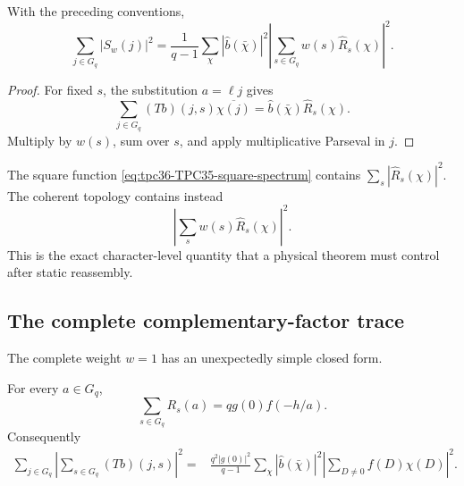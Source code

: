 \begin{theorem}
\label{thm:tpc36-weighted-coherent-spectrum}
With the preceding conventions,
\begin{equation}
 \boxed{
 \sum_{j\in G_q}|S_w(j)|^2
 =\frac1{q-1}\sum_\chi
 |\widehat b(\bar\chi)|^2
 \left|\sum_{s\in G_q}w(s)\widehat R_s(\chi)\right|^2.}
 \label{eq:tpc36-weighted-coherent-spectrum}
\end{equation}
\end{theorem}

\begin{proof}
For fixed \(s\), the substitution \(a=\ell j\) gives
\begin{equation}
 \sum_{j\in G_q}(Tb)(j,s)\overline{\chi(j)}
 =\widehat b(\bar\chi)\widehat R_s(\chi).
 \label{eq:tpc36-fixed-s-transform}
\end{equation}
Multiply by \(w(s)\), sum over \(s\), and apply multiplicative Parseval
in \(j\).
\end{proof}

The square function \eqref{eq:tpc36-TPC35-square-spectrum} contains
\(\sum_s|\widehat R_s(\chi)|^2\).  The coherent topology contains instead
\begin{equation}
 \left|\sum_sw(s)\widehat R_s(\chi)\right|^2.
 \label{eq:tpc36-coherent-character-gate}
\end{equation}
This is the exact character-level quantity that a physical theorem must
control after static reassembly.

\subsection{The complete complementary-factor trace}

The complete weight \(w=1\) has an unexpectedly simple closed form.

\begin{theorem}
\label{thm:tpc36-complete-s-trace}
For every \(a\in G_q\),
\begin{equation}
 \boxed{
 \sum_{s\in G_q}R_s(a)=qg(0)f(-h/a).}
 \label{eq:tpc36-complete-s-trace}
\end{equation}
Consequently
\begin{align}
 \sum_{j\in G_q}\left|\sum_{s\in G_q}(Tb)(j,s)\right|^2
 ={}&\frac{q^2|g(0)|^2}{q-1}
 \sum_\chi|\widehat b(\bar\chi)|^2
 \left|\sum_{D\ne0}f(D)\chi(D)\right|^2.
 \label{eq:tpc36-complete-s-energy}
\end{align}
\end{theorem}

